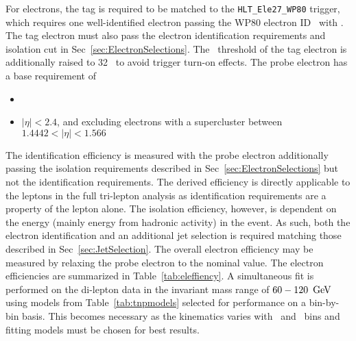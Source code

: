 For electrons, the tag is required to be matched to the \verb=HLT_Ele27_WP80= trigger, which requires one well-identified electron passing the WP80 electron ID~\cite{egammaidtwiki} with \pt {} \GeV. The tag electron must also pass the electron identification requirements and isolation cut in Sec~\ref{sec:ElectronSelections}. The \pt \ threshold of the tag electron is additionally raised to 32 \GeV \ to avoid trigger turn-on effects. The probe electron has a base requirement of
\begin{itemize}
\item \pt {} \GeV 
\item $|\eta| \lt 2.4$, and excluding electrons with a supercluster between $1.4442 \lt |\eta| \lt 1.566$
\end{itemize}
The identification efficiency is measured with the probe electron additionally passing the isolation requirements described in Sec~\ref{sec:ElectronSelections} but not the identification requirements. The derived efficiency is directly applicable to the leptons in the full tri-lepton analysis as identification requirements are a property of the lepton alone. The isolation efficiency, however, is dependent on the energy (mainly energy from hadronic activity) in the event. As such, both the electron identification and an additional jet selection is required matching those described in Sec~\ref{sec:JetSelection}. The overall electron efficiency may be measured by relaxing the probe electron to the nominal value. The electron efficiencies are summarized in Table~\ref{tab:eleffiency}. A simultaneous fit is performed on the di-lepton data in the invariant mass range of $60-120 \ \,\text{Ge\hspace{-.08em}V}$ using models from Table~\ref{tab:tnpmodels} selected for performance on a bin-by-bin basis. This becomes necessary as the kinematics varies with \pt \ and \aeta \ bins and fitting models must be chosen for best results.\\


